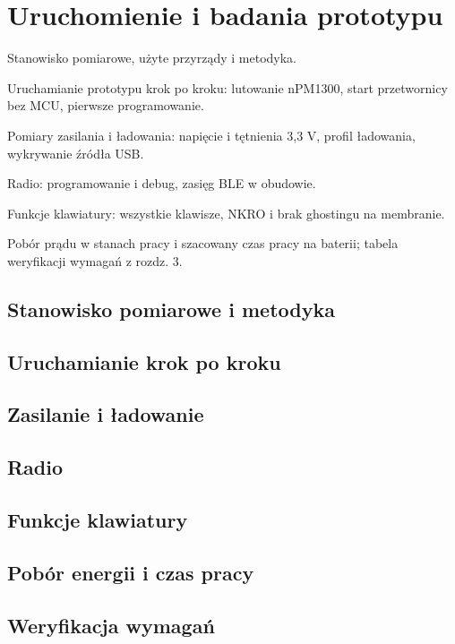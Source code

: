 \chapter{Uruchomienie i badania prototypu}\label{ch:badania}
\begin{zawartosc}
  \item Stanowisko pomiarowe, użyte przyrządy i metodyka.
  \item Uruchamianie prototypu krok po kroku: lutowanie nPM1300, start przetwornicy bez MCU, pierwsze programowanie.
  \item Pomiary zasilania i ładowania: napięcie i tętnienia 3,3 V, profil ładowania, wykrywanie źródła USB.
  \item Radio: programowanie i debug, zasięg BLE w obudowie.
  \item Funkcje klawiatury: wszystkie klawisze, NKRO i brak ghostingu na membranie.
  \item Pobór prądu w stanach pracy i szacowany czas pracy na baterii; tabela weryfikacji wymagań z rozdz. 3.
\end{zawartosc}

\section{Stanowisko pomiarowe i metodyka}\label{sec:metodyka}

\section{Uruchamianie krok po kroku}\label{sec:uruchomienie}

\section{Zasilanie i ładowanie}\label{sec:pomzasilanie}

\section{Radio}\label{sec:pomradio}

\section{Funkcje klawiatury}\label{sec:pomklawiatura}

\section{Pobór energii i czas pracy}\label{sec:pomenergia}

\section{Weryfikacja wymagań}\label{sec:weryfikacja}

